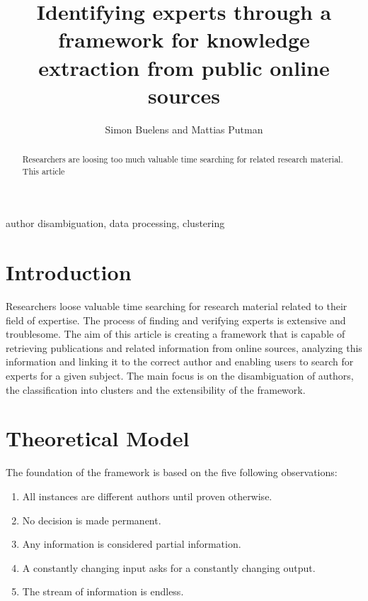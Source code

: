 \documentclass[9pt, twocolumn]{phdsymp} %
\begin{document}
\title{Identifying experts through a framework for knowledge extraction from public online sources} %

\author{Simon Buelens and Mattias Putman}


\maketitle

\begin{abstract} 

Researchers are loosing too much valuable time searching for related research material. This article 

\end{abstract}

\begin{keywords}
author disambiguation, data processing, clustering
\end{keywords}

\section{Introduction}

Researchers loose valuable time searching for research material related to their field of expertise. The process of finding and verifying experts is extensive and troublesome. The aim of this article is creating a framework that is capable of retrieving publications and related information from online sources, analyzing this information and linking it to the correct author and enabling users to search for experts for a given subject. The main focus is on the disambiguation of authors, the classification into clusters and the extensibility of the framework.

\section{Theoretical Model}

The foundation of the framework is based on the five following observations:

\begin{enumerate}
	\item All instances are different authors until proven otherwise.
	\item No decision is made permanent.
	\item Any information is considered partial information.
	\item A constantly changing input asks for a constantly changing output.
	\item The stream of information is endless.
\end{enumerate}
\end{document}
